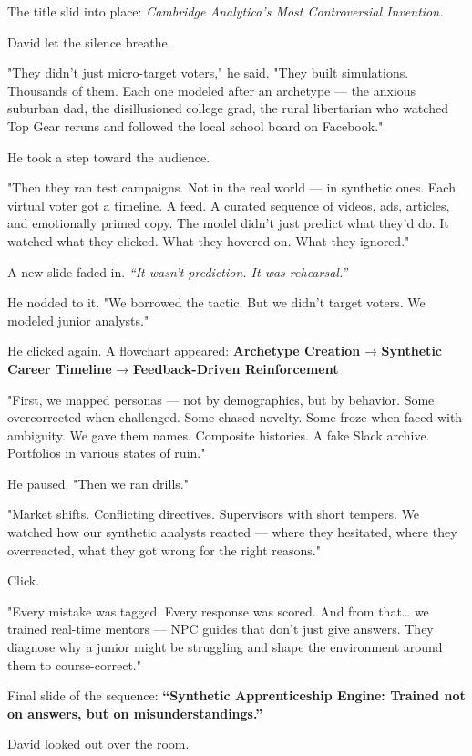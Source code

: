 The title slid into place:
\textit{Cambridge Analytica's Most Controversial Invention.}

David let the silence breathe.

"They didn’t just micro-target voters," he said. "They built simulations. Thousands of them. Each one modeled after an archetype — the anxious suburban dad, the disillusioned college grad, the rural libertarian who watched Top Gear reruns and followed the local school board on Facebook."

He took a step toward the audience.

"Then they ran test campaigns. Not in the real world — in synthetic ones.
Each virtual voter got a timeline. A feed. A curated sequence of videos, ads, articles, and emotionally primed copy. The model didn't just predict what they'd do. It watched what they clicked. What they hovered on. What they ignored."

A new slide faded in.
\textit{“It wasn’t prediction. It was rehearsal.”}

He nodded to it. "We borrowed the tactic. But we didn’t target voters.
We modeled junior analysts."

He clicked again. A flowchart appeared:
\textbf{Archetype Creation} → \textbf{Synthetic Career Timeline} → \textbf{Feedback-Driven Reinforcement}

"First, we mapped personas — not by demographics, but by behavior.
Some overcorrected when challenged. Some chased novelty. Some froze when faced with ambiguity. We gave them names. Composite histories. A fake Slack archive. Portfolios in various states of ruin."

He paused. "Then we ran drills."

"Market shifts. Conflicting directives. Supervisors with short tempers. We watched how our synthetic analysts reacted — where they hesitated, where they overreacted, what they got wrong for the right reasons."

Click.

"Every mistake was tagged. Every response was scored. And from that… we trained real-time mentors — NPC guides that don’t just give answers. They diagnose why a junior might be struggling and shape the environment around them to course-correct."

Final slide of the sequence:
\textbf{“Synthetic Apprenticeship Engine: Trained not on answers, but on misunderstandings.”}

David looked out over the room.

